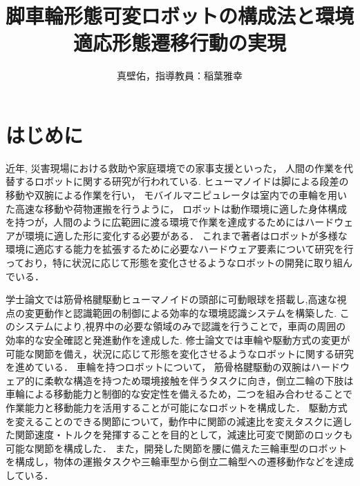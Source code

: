\documentclass[twocolumn]{d-abst}
\title{脚車輪形態可変ロボットの構成法と環境適応形態遷移行動の実現}
\author{真壁佑，指導教員：稲葉雅幸}
\begin{document}
\pagestyle{empty}
\maketitle
\thispagestyle{empty}
\sloppy

\section{はじめに}
近年, 災害現場における救助や家庭環境での家事支援といった， 人間の作業を代替するロボットに関する研究が行われている.
ヒューマノイドは脚による段差の移動や双腕による作業を行い， モバイルマニピュレータは室内での車輪を用いた高速な移動や荷物運搬を行うように， ロボットは動作環境に適した身体構成を持つが，人間のように広範囲に渡る環境で作業を達成するためにはハードウェアが環境に適した形に変化する必要がある．
これまで著者はロボットが多様な環境に適応する能力を拡張するために必要なハードウェア要素について研究を行っており，特に状況に応じて形態を変化させるようなロボットの開発に取り組んでいる．

学士論文では筋骨格腱駆動ヒューマノイドの頭部に可動眼球を搭載し,高速な視点の変更動作と認識範囲の制御による効率的な環境認識システムを構築した.
このシステムにより,視界中の必要な領域のみで認識を行うことで，車両の周囲の効率的な安全確認と発進動作を達成した\cite{makabe2018eye}.
修士論文では車輪や駆動方式の変更が可能な関節を備え，状況に応じて形態を変化させるようなロボットに関する研究を進めている．
車輪を持つロボットについて，%
筋骨格腱駆動の双腕はハードウェア的に柔軟な構造を持つため環境接触を伴うタスクに向き，倒立二輪の下肢は車輪による移動能力と制御的な安定性を備えるため，二つを組み合わせることで作業能力と移動能力を活用することが可能になロボットを構成した\cite{kawaharazuka2018twimp}．
駆動方式を変えることのできる関節について，動作中に関節の減速比を変えタスクに適した関節速度・トルクを発揮することを目的として，減速比可変で関節のロックも可能な関節を構成した．
また，開発した関節を腰に備えた三輪車型のロボットを構成し，物体の運搬タスクや三輪車型から倒立二輪型への遷移動作などを達成している\cite{makabe2019module}．
\end{document}
